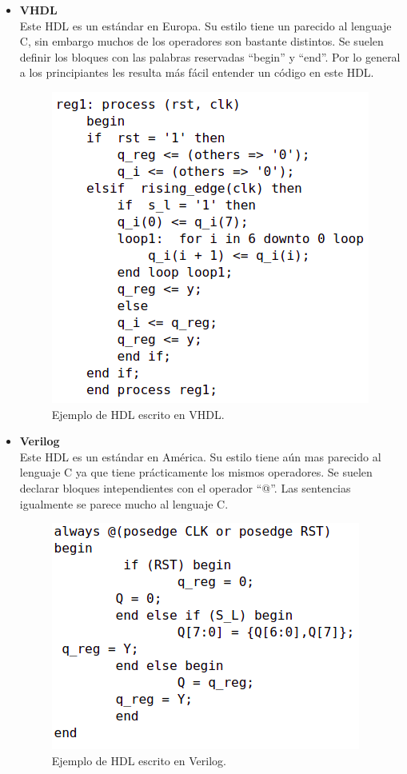 \documentclass[twoside,spanish,ESP,MSc]{plantillaLabUPV}
\theoremstyle{definition}
\begin{document}
\begin{itemize}

\item \textbf{VHDL}\\
Este HDL es un estándar en Europa. Su estilo tiene un parecido al lenguaje C, sin embargo muchos de los operadores son bastante distintos. Se suelen definir los bloques con las palabras reservadas ``begin'' y ``end''. Por lo general a los principiantes les resulta más fácil entender un código en este HDL.\\

\begin{figure}[h]
\centering
\includegraphics[scale=0.5]{ima/vhdl.png}
\caption{Ejemplo de HDL escrito en VHDL.%
\label{vhdl}}
\end{figure}

\item \textbf{Verilog}\\
Este HDL es un estándar en América. Su estilo tiene aún mas parecido al lenguaje C ya que tiene prácticamente los mismos operadores. Se suelen declarar bloques intependientes con el operador ``@''. Las sentencias igualmente se parece mucho al lenguaje C.\\

\begin{figure}[h]
\centering
\includegraphics[scale=0.5]{ima/verilog.png}
\caption{Ejemplo de HDL escrito en Verilog.%
\label{veri}}
\end{figure}


\end{itemize}
\end{document}
